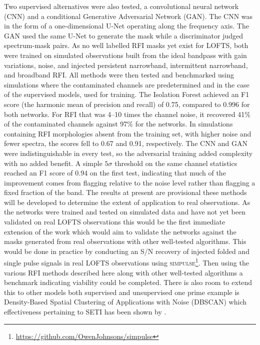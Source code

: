 Two supervised alternatives were also tested, a convolutional neural network (CNN) and a conditional Generative Adversarial Network (GAN). The CNN was in the form of a one-dimensional U-Net operating along the frequency axis. The GAN used the same U-Net to generate the mask while a discriminator judged spectrum-mask pairs. As no well labelled RFI masks yet exist for LOFTS, both were trained on simulated observations built from the ideal bandpass with gain variations, noise, and injected persistent narrowband, intermittent narrowband, and broadband RFI. All methods were then tested and benchmarked using simulations where the contaminated channels are predetermined and in the case of the supervised models, used for training. The Isolation Forest achieved an F1 score (the harmonic mean of precision and recall) of 0.75, compared to 0.996 for both networks. For RFI that was 4–10 times the channel noise, it recovered 41\% of the contaminated channels against 97\% for the networks. In simulations containing RFI morphologies absent from the training set, with higher noise and fewer spectra, the scores fell to 0.67 and 0.91, respectively. The CNN and GAN were indistinguishable in every test, so the adversarial training added complexity with no added benefit. A simple $5\sigma$ threshold on the same channel statistics reached an F1 score of 0.94 on the first test, indicating that much of the improvement comes from flagging relative to the noise level rather than flagging a fixed fraction of the band. The results at present are provisional these methods will be developed to determine the extent of application to real observations. As the networks were trained and tested on simulated data and have not yet been validated on real LOFTS observations this would be the first immediate extension of the work which would aim to validate the networks against the masks generated from real observations with other well-tested algorithms. This would be done in practice by conducting an S/N recovery of injected folded and single pulse signals in real LOFTS observations using \textsc{simpulse}\footnote{\url{https://github.com/OwenJohnsons/simpulse}}. Then using the various RFI methods described here along with other well-tested algorithms a benchmark indicating viability could be completed. There is also room to extend this to other models both supervised and unsupervised one prime example is Density-Based Spatial Clustering of Applications with Noise (DBSCAN) which effectiveness pertaining to SETI has been shown by \citet{zhao_improved_2026}.


